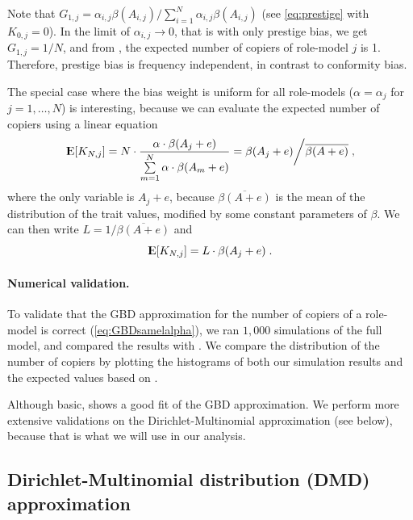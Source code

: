 \documentclass[12pt]{extarticle}
\DeclareMathOperator*{\E}{{\rm I\kern-.3em E}}
\begin{document}
Note that $G_{1,j} = \alpha_{i,j} \beta(A_{i,j}) / \sum_{i=1}^{N}{\alpha_{i,j} \beta(A_{i,j})}$ (see \cref{eq:prestige} with $K_{0,j}=0$). In the limit of $\alpha_{i,j} \to 0$, that is with only prestige bias, we get $G_{1,j} = 1/N$, and from , the expected number of copiers of role-model $j$ is 1. Therefore, prestige bias is frequency independent, in contrast to conformity bias.

The special case where the bias weight is uniform for all role-models ($\alpha = \alpha_j$ for $j=1,\ldots, N$) is interesting, because we can evaluate the expected number of copiers using a linear equation
\begin{equation}\label{eq:GBDsamelalpha}
\E[K_{N,j}]= N\cdot\frac{\alpha\cdot\beta(A_j+e)}{\sum\limits_{m=1}^{N}\alpha\cdot\beta(A_m+e)} =\beta(A_j+e) \bigg/ \overline{\beta(A+e)} \;,
\end{equation}
where the only variable is $A_j+e$, because $\overline{\beta(A+e)}$ is the mean of the distribution of the trait values, modified by some constant parameters of $\beta$.
We can then write $L = 1/\overline{\beta(A+e)}$ and
\begin{equation}\label{eq:linearEq}
\E[K_{N,j}] = L\cdot \beta(A_j+e) \;.
\end{equation}

\paragraph{Numerical validation.}
To validate that the GBD approximation for the number of copiers of a role-model is correct (\cref{eq:GBDsamelalpha}), 
we ran $1,000$ simulations of the full model, and compared the results with .
We compare the distribution of the number of copiers by plotting the histograms of both our simulation results and the expected values based on .

Although basic,  shows a good fit of the GBD approximation.
We perform more extensive validations on the Dirichlet-Multinomial approximation (see below), because that is what we will use in our analysis.

\subsection*{Dirichlet-Multinomial distribution (DMD) approximation}
\end{document}
